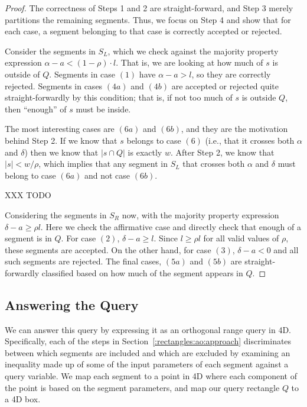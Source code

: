 \begin{proof}
The correctness of Steps 1 and 2 are straight-forward, and Step 3 merely partitions the remaining segments. Thus, we focus on Step 4 and show that for each case, a segment belonging to that case is correctly accepted or rejected.

Consider the segments in $S_L$, which we check against the majority property expression $\alpha - a < (1 - \rho) \cdot l$. That is, we are looking at how much of $s$ is outside of $Q$. Segments in case $(1)$ have $\alpha - a > l$, so they are correctly rejected. Segments in cases $(4a)$ and $(4b)$ are accepted or rejected quite straight-forwardly by this condition; that is, if not too much of $s$ is outside $Q$, then ``enough'' of $s$ must be inside.  

The most interesting cases are $(6a)$ and $(6b)$, and they are the motivation behind Step 2.  If we know that $s$ belongs to case $(6)$ (i.e., that it crosses both $\alpha$ and $\delta$) then we know that $|s \cap Q|$ is exactly $w$. After Step 2, we know that $|s| < w / \rho$, which implies that any segment in $S_L$ that crosses both $\alpha$ and $\delta$ must belong to case $(6a)$ and not case $(6b)$.

XXX TODO

Considering the segments in $S_R$ now, with the majority property expression $\delta - a \geq  \rho l$. Here we check the affirmative case and directly check that enough of a segment is in $Q$. For case $(2)$, $\delta - a \geq l$. Since $l \geq \rho l$ for all valid values of $\rho$, these segments are accepted.  On the other hand, for case $(3)$, $\delta - a < 0$ and all such segments are rejected. The final cases, $(5a)$ and $(5b)$ are straight-forwardly classified based on how much of the segment appears in $Q$.

\end{proof}


\subsection{Answering the Query}
\label{:rectangles:ap:analysis}

We can answer this query by expressing it as an orthogonal range query in 4D. Specifically, each of the steps in Section~\ref{:rectangles:ao:approach} discriminates between which segments are included and which are excluded by examining an inequality made up of some of the input parameters of each segment against a query variable. We map each segment to a point in 4D where each component of the point is based on the segment parameters, and map our query rectangle $Q$ to a 4D box.


